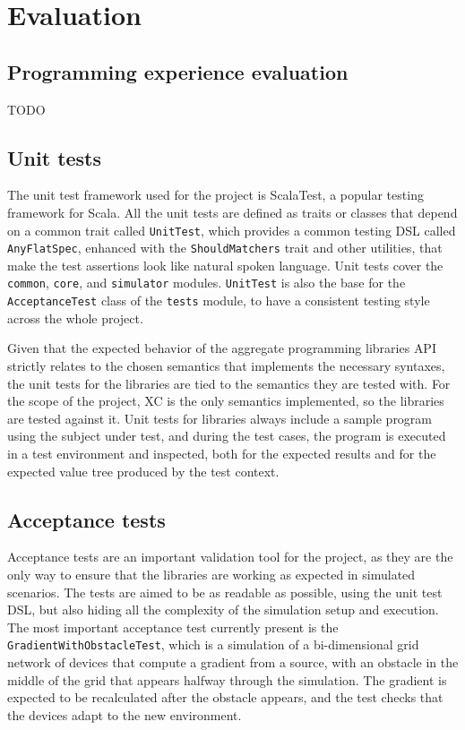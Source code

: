 \chapter{Evaluation}
\label{chap:evaluation}

\section{Programming experience evaluation}

TODO

\section{Unit tests}

The unit test framework used for the project is ScalaTest, a popular testing framework for Scala.
%
All the unit tests are defined as traits or classes that depend on a common trait called \texttt{UnitTest}, which provides a common testing \ac{DSL} called \texttt{AnyFlatSpec}, enhanced with the \texttt{ShouldMatchers} trait and other utilities, that make the test assertions look like natural spoken language.
%
Unit tests cover the \texttt{common}, \texttt{core}, and \texttt{simulator} modules.
%
\texttt{UnitTest} is also the base for the \texttt{AcceptanceTest} class of the \texttt{tests} module, to have a consistent testing style across the whole project.

Given that the expected behavior of the aggregate programming libraries \ac{API} strictly relates to the chosen semantics that implements the necessary syntaxes, the unit tests for the libraries are tied to the semantics they are tested with.
%
For the scope of the project, \ac{XC} is the only semantics implemented, so the libraries are tested against it.
%
Unit tests for libraries always include a sample program using the subject under test, and during the test cases, the program is executed in a test environment and inspected, both for the expected results and for the expected value tree produced by the test context.


\section{Acceptance tests}

Acceptance tests are an important validation tool for the project, as they are the only way to ensure that the libraries are working as expected in simulated scenarios.
%
The tests are aimed to be as readable as possible, using the unit test \ac{DSL}, but also hiding all the complexity of the simulation setup and execution.
%
The most important acceptance test currently present is the \texttt{GradientWithObstacleTest}, which is a simulation of a bi-dimensional grid network of devices that compute a gradient from a source, with an obstacle in the middle of the grid that appears halfway through the simulation.
%
The gradient is expected to be recalculated after the obstacle appears, and the test checks that the devices adapt to the new environment.


